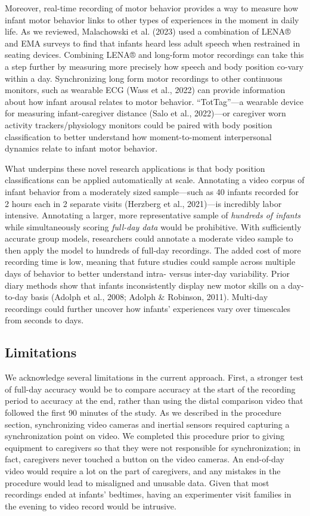 \documentclass[
  man]{apa6}
\begin{document}
Moreover, real-time recording of motor behavior provides a way to measure how infant motor behavior links to other types of experiences in the moment in daily life. As we reviewed, Malachowski et al. (2023) used a combination of LENA® and EMA surveys to find that infants heard less adult speech when restrained in seating devices. Combining LENA® and long-form motor recordings can take this a step further by measuring more precisely how speech and body position co-vary within a day. Synchronizing long form motor recordings to other continuous monitors, such as wearable ECG (Wass et al., 2022) can provide information about how infant arousal relates to motor behavior. ``TotTag''---a wearable device for measuring infant-caregiver distance (Salo et al., 2022)---or caregiver worn activity trackers/physiology monitors could be paired with body position classification to better understand how moment-to-moment interpersonal dynamics relate to infant motor behavior.

What underpins these novel research applications is that body position classifications can be applied automatically at scale. Annotating a video corpus of infant behavior from a moderately sized sample---such as 40 infants recorded for 2 hours each in 2 separate visits (Herzberg et al., 2021)---is incredibly labor intensive. Annotating a larger, more representative sample of \emph{hundreds of infants} while simultaneously scoring \emph{full-day data} would be prohibitive. With sufficiently accurate group models, researchers could annotate a moderate video sample to then apply the model to hundreds of full-day recordings. The added cost of more recording time is low, meaning that future studies could sample across multiple days of behavior to better understand intra- versus inter-day variability. Prior diary methods show that infants inconsistently display new motor skills on a day-to-day basis (Adolph et al., 2008; Adolph \& Robinson, 2011). Multi-day recordings could further uncover how infants' experiences vary over timescales from seconds to days.

\hypertarget{limitations}{%
\subsection{Limitations}\label{limitations}}

We acknowledge several limitations in the current approach. First, a stronger test of full-day accuracy would be to compare accuracy at the start of the recording period to accuracy at the end, rather than using the distal comparison video that followed the first 90 minutes of the study. As we described in the procedure section, synchronizing video cameras and inertial sensors required capturing a synchronization point on video. We completed this procedure prior to giving equipment to caregivers so that they were not responsible for synchronization; in fact, caregivers never touched a button on the video cameras. An end-of-day video would require a lot on the part of caregivers, and any mistakes in the procedure would lead to misaligned and unusable data. Given that most recordings ended at infants' bedtimes, having an experimenter visit families in the evening to video record would be intrusive.
\end{document}
